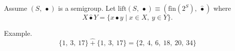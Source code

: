 Assume $(S,\ \bullet)$ is a semigroup. 
Let 
$\mathrm{lift}(S,\ \bullet) \equiv (\mathrm{fin}(2^S),\ \hat{\bullet})$ where 
\[ 
X \hat{\bullet} Y  = \{x \bullet y \mid x\in X,\ y\in Y\}. 
\]

Example. 
\[
    \{1,\ 3,\ 17\}\ \hat{+}\ \{1,\ 3,\ 17\} = \{2,\ 4,\ 6,\ 18,\ 20,\ 34\} 
\] 

